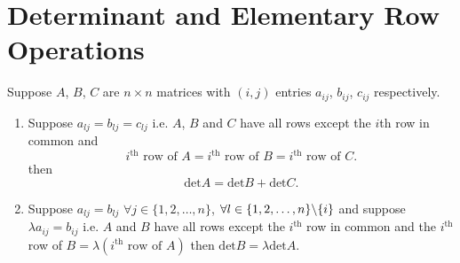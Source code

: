 \documentclass{report}
\begin{document}
\section{Determinant and Elementary Row Operations }
Suppose $A$, $B$, $C$ are $n \times n$  matrices with $\left( i,j \right) $ entries $a_{ij}$, $b_{ij}$, $c_{ij}$ respectively.\\
\begin{enumerate}[label=(\roman*)]
  \item Suppose $a_{lj}=b_{lj}=c_{lj}$ i.e.  $A$, $B$ and $C$ have all rows except the $i$th row in common and  \[
    i^{\text{th}} \text{ row of } A 
= i^{\text{th}} \text{ row of } B 
= i^{\text{th}} \text{ row of } C 
  .\] then \[
  \text{det} A = \text{det} B + \text{det} C
  .\] 
\item Suppose $a_{lj }= b _{lj}$ $\forall j \in \{ 1,2,\ldots , n\} $, $\forall  l \in \{ 1,2,\ldots , n\} \symbol{92}\{ i \} $ and suppose $\lambda a_{ij}= b_{ij}$ i.e. $A$ and $B$ have all rows except the  $i^{\text{th}}$ row in common and the $i^{\text{th}}$ row of $B = \lambda \left( i^{\text{th}} \text{ row of }A \right) $ then $\text{det} B = \lambda \text{det} A$.

\end{enumerate}
\end{document}
